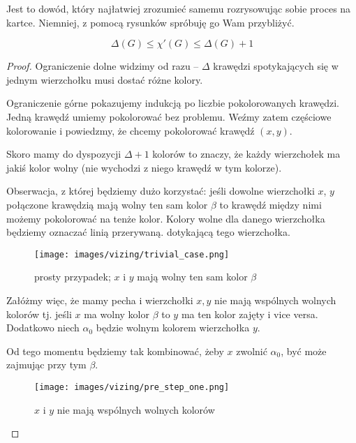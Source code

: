     Jest to dowód, który najłatwiej zrozumieć samemu rozrysowując sobie proces na kartce. Niemniej, z pomocą rysunków spróbuję go Wam przybliżyć.
    
    \begin{theorem}[Vizing]
        $$\Delta(G) \leq \chi'(G) \leq \Delta(G) + 1$$
    \end{theorem}
    
    \begin{proof}
        Ograniczenie dolne widzimy od razu -- $\Delta$ krawędzi spotykających się w jednym wierzchołku musi dostać różne kolory. 
        
        Ograniczenie górne pokazujemy indukcją po liczbie pokolorowanych krawędzi. Jedną krawędź umiemy pokolorować bez problemu.
        Weźmy zatem częściowe kolorowanie i powiedzmy, że chcemy pokolorować krawędź $(x, y)$.
        
        Skoro mamy do dyspozycji $\Delta + 1$ kolorów to znaczy, że każdy wierzchołek ma jakiś kolor wolny (nie wychodzi z niego krawędź w tym kolorze). 
        
        Obserwacja, z której będziemy dużo korzystać: jeśli dowolne wierzchołki $x$, $y$ połączone krawędzią mają wolny ten sam kolor $\beta$
        to krawędź między nimi możemy pokolorować na tenże kolor. Kolory wolne dla danego wierzchołka będziemy oznaczać linią przerywaną. dotykającą tego wierzchołka.
        
        \begin{figure}[ht]
            \centering
            \texttt{[image: images/vizing/trivial\_case.png]}
            \caption{prosty przypadek; $x$ i $y$ mają wolny ten sam kolor $\beta$}
        \end{figure}
        
        Załóżmy więc, że mamy pecha i wierzchołki $x, y$ nie mają wspólnych wolnych kolorów tj. jeśli $x$ ma wolny kolor $\beta$
        to $y$ ma ten kolor zajęty i vice versa. Dodatkowo niech $\alpha_0$ będzie wolnym kolorem wierzchołka $y$.
        
        Od tego momentu będziemy tak kombinować, żeby $x$ zwolnić $\alpha_0$, być może zajmując przy tym $\beta$.
        
        \begin{figure}[H]
            \centering
            \texttt{[image: images/vizing/pre\_step\_one.png]}
            \caption{$x$ i $y$ nie mają wspólnych wolnych kolorów}
        \end{figure}
        

\end{proof}
